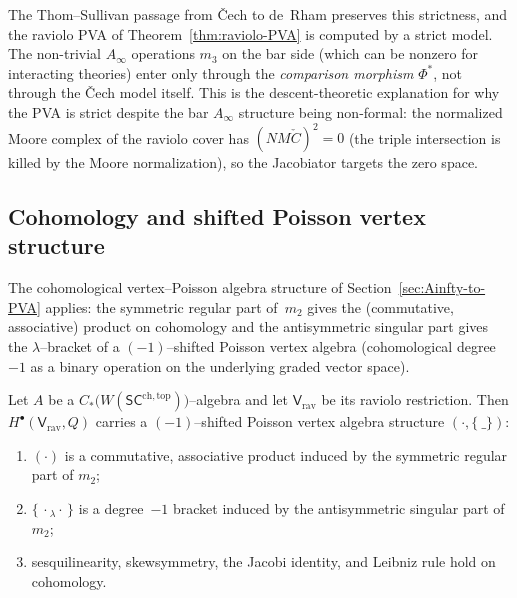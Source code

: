 \begin{remark}
The Thom--Sullivan passage from \v{C}ech to de~Rham preserves
this strictness, and the raviolo PVA of
Theorem~\ref{thm:raviolo-PVA} is computed by a strict model.
The non-trivial $A_\infty$ operations $m_3$ on the bar side
(which can be nonzero for interacting theories) enter only
through the \emph{comparison morphism} $\Phi^*$, not through
the \v{C}ech model itself. This is the descent-theoretic
explanation for why the PVA is strict despite the bar
$A_\infty$ structure being non-formal: the normalized Moore complex of the raviolo cover has
$(NM\check{C})^2 = 0$ (the triple intersection is killed by the Moore normalization), so the Jacobiator targets the zero space.
\end{remark}

\subsection{Cohomology and shifted Poisson vertex structure}
\label{subsec:raviolo-PVA}
The cohomological vertex--Poisson algebra structure of
Section~\ref{sec:Ainfty-to-PVA} applies: the symmetric regular part of~$m_2$ gives the
(commutative, associative) product on cohomology and the antisymmetric singular part gives
the $\lambda$--bracket of a $(-1)$--shifted Poisson vertex algebra (cohomological degree $-1$ as a binary operation on the underlying graded vector space).

\begin{theorem}
\label{thm:raviolo-PVA}
Let $A$ be a $C_\ast\!\bigl(W(\mathsf{SC}^{\mathrm{ch,top}})\bigr)$–algebra
and let $\mathsf V_{\mathrm{rav}}$ be its raviolo restriction.
Then $H^\bullet(\mathsf V_{\mathrm{rav}},Q)$ carries a $(-1)$–shifted
Poisson vertex algebra structure $(\cdot,\{\ \_ \})$:
\begin{enumerate}[label=(\alph*)]
\item $(\cdot)$ is a commutative, associative product induced by the symmetric regular part of $m_2$;
\item $\{\,\cdot{}_\lambda \cdot\,\}$ is a degree~$-1$ bracket induced by the antisymmetric singular part of $m_2$;
\item sesquilinearity, skewsymmetry, the Jacobi identity, and Leibniz rule hold on cohomology.
\end{enumerate}
\end{theorem}

